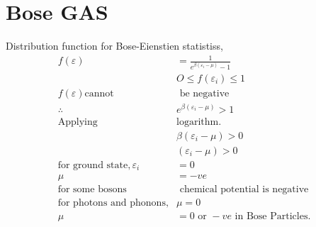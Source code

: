 \section{Bose GAS}
Distribution function for Bose-Eienstien statistiss,
\begin{align*}
f(\varepsilon)&=\frac{1}{e^{\beta(\varepsilon_i-\mu)}-1}\\
&O\leq f(\varepsilon_i)\leq1\\
f(\varepsilon)\text{cannot}&\text{ be negative}\\
\therefore\quad&e^{\beta(\varepsilon_i-\mu)}>1\\
\text{Applying }&\text{logarithm.}\\
&\beta(\varepsilon_i-\mu)>0\\
&(\varepsilon_i-\mu)>0\\
\text{for ground state},\varepsilon_{i}&=0\\
\mu&=-ve\\
\text{for some bosons}&\text{ chemical potential is negative} \\
\text{for photons and phonons,}&\mu=0\\
\mu&=0\text{ or }-ve\text{ in Bose Particles.}
\end{align*}
